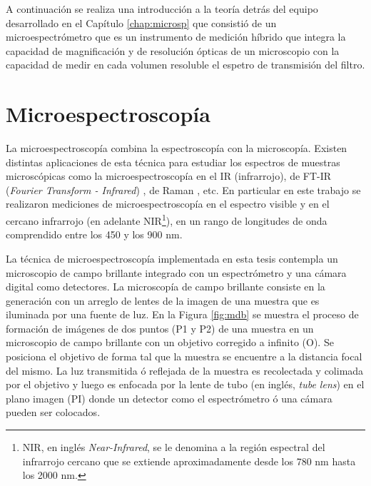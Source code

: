 A continuación se realiza una introducción a la teoría detrás del equipo desarrollado en el Capítulo \ref{chap:microsp} que consistió de un microespectrómetro que es un instrumento de medición híbrido que integra la capacidad de magnificación y de resolución ópticas de un microscopio con la capacidad de medir en cada volumen resoluble el espetro de transmisión del filtro.


\singlespacing
\section{Microespectroscopía}
\label{sec:microespp}


\hspace{0.5cm}La microespectroscopía combina la espectroscopía con la microscopía. Existen distintas aplicaciones de esta técnica para estudiar los espectros de muestras microscópicas como la microespectroscopía en el IR (infrarrojo)\cite{WALSH20071}, de FT-IR (\textit{Fourier Transform - Infrared}) \cite{kani}, de Raman \cite{defaria}, etc. En particular en este trabajo se realizaron mediciones de microespectroscopía en el espectro visible y en el cercano infrarrojo (en adelante NIR\footnote{NIR, en inglés \textit{Near-Infrared}, se le denomina a la región espectral del infrarrojo cercano que se extiende aproximadamente desde los 780 nm hasta los 2000 nm.}), en un rango de longitudes de onda comprendido entre los 450 y los 900 nm.

La técnica de microespectroscopía implementada en esta tesis contempla un microscopio de campo brillante integrado con un espectrómetro y una cámara digital como detectores. La microscopía de campo brillante consiste en la generación con un arreglo de lentes de la imagen de una muestra que es iluminada por una fuente de luz. En la Figura \ref{fig:mdb} se muestra el proceso de formación de imágenes de dos puntos (P1 y P2) de una muestra en un microscopio de campo brillante con un objetivo corregido a infinito (O). Se posiciona el objetivo de forma tal que la muestra se encuentre a la distancia focal del mismo. La luz transmitida ó reflejada de la muestra es recolectada y colimada por el objetivo y luego es enfocada por la lente de tubo (en inglés, \textit{tube lens}) en el plano imagen (PI) donde un detector como el espectrómetro ó una cámara pueden ser colocados.

